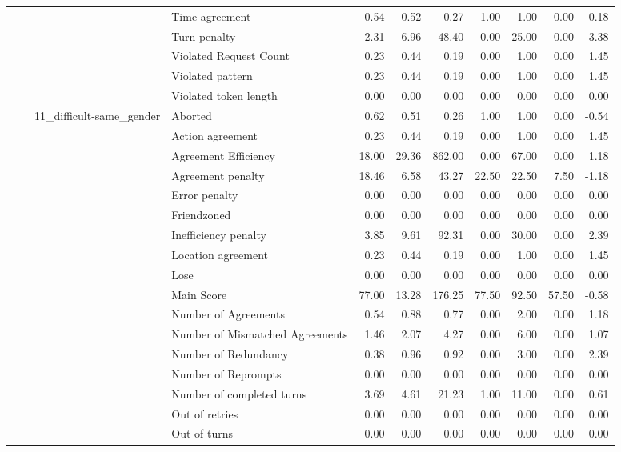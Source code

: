 \begin{tabular}{llllrrrrrrr}
 &  &  & Time agreement & 0.54 & 0.52 & 0.27 & 1.00 & 1.00 & 0.00 & -0.18 \\
 &  &  & Turn penalty & 2.31 & 6.96 & 48.40 & 0.00 & 25.00 & 0.00 & 3.38 \\
 &  &  & Violated Request Count & 0.23 & 0.44 & 0.19 & 0.00 & 1.00 & 0.00 & 1.45 \\
 &  &  & Violated pattern & 0.23 & 0.44 & 0.19 & 0.00 & 1.00 & 0.00 & 1.45 \\
 &  &  & Violated token length & 0.00 & 0.00 & 0.00 & 0.00 & 0.00 & 0.00 & 0.00 \\
\cline{3-11}
 &  & \multirow[t]{27}{*}{11_difficult-same_gender} & Aborted & 0.62 & 0.51 & 0.26 & 1.00 & 1.00 & 0.00 & -0.54 \\
 &  &  & Action agreement & 0.23 & 0.44 & 0.19 & 0.00 & 1.00 & 0.00 & 1.45 \\
 &  &  & Agreement Efficiency & 18.00 & 29.36 & 862.00 & 0.00 & 67.00 & 0.00 & 1.18 \\
 &  &  & Agreement penalty & 18.46 & 6.58 & 43.27 & 22.50 & 22.50 & 7.50 & -1.18 \\
 &  &  & Error penalty & 0.00 & 0.00 & 0.00 & 0.00 & 0.00 & 0.00 & 0.00 \\
 &  &  & Friendzoned & 0.00 & 0.00 & 0.00 & 0.00 & 0.00 & 0.00 & 0.00 \\
 &  &  & Inefficiency penalty & 3.85 & 9.61 & 92.31 & 0.00 & 30.00 & 0.00 & 2.39 \\
 &  &  & Location agreement & 0.23 & 0.44 & 0.19 & 0.00 & 1.00 & 0.00 & 1.45 \\
 &  &  & Lose & 0.00 & 0.00 & 0.00 & 0.00 & 0.00 & 0.00 & 0.00 \\
 &  &  & Main Score & 77.00 & 13.28 & 176.25 & 77.50 & 92.50 & 57.50 & -0.58 \\
 &  &  & Number of Agreements & 0.54 & 0.88 & 0.77 & 0.00 & 2.00 & 0.00 & 1.18 \\
 &  &  & Number of Mismatched Agreements & 1.46 & 2.07 & 4.27 & 0.00 & 6.00 & 0.00 & 1.07 \\
 &  &  & Number of Redundancy & 0.38 & 0.96 & 0.92 & 0.00 & 3.00 & 0.00 & 2.39 \\
 &  &  & Number of Reprompts & 0.00 & 0.00 & 0.00 & 0.00 & 0.00 & 0.00 & 0.00 \\
 &  &  & Number of completed turns & 3.69 & 4.61 & 21.23 & 1.00 & 11.00 & 0.00 & 0.61 \\
 &  &  & Out of retries & 0.00 & 0.00 & 0.00 & 0.00 & 0.00 & 0.00 & 0.00 \\
 &  &  & Out of turns & 0.00 & 0.00 & 0.00 & 0.00 & 0.00 & 0.00 & 0.00 \\

\end{tabular}
